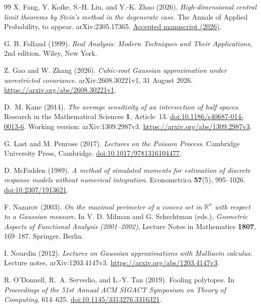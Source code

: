 \documentclass[11pt,letterpaper]{article}
\theoremstyle{remark}
\newcommand{\R}{\mathbb R}
\begin{document}
\begin{thebibliography}{99}
X. Fang, Y. Koike, S.-H. Liu, and Y.-K. Zhao (2026).
\emph{High-dimensional central limit theorems by Stein's method in
the degenerate case}. The Annals of Applied Probability, to appear.
arXiv:2305.17365.
\href{https://research.cuhk.edu.hk/en/publications/high-dimensional-central-limit-theorems-by-steins-method-in-the-d/}{Accepted manuscript (2026)}.

G. B. Folland (1999).
\emph{Real Analysis: Modern Techniques and Their Applications}, 2nd edition.
Wiley, New York.

Z. Gao and W. Zhang (2026).
\emph{Cubic-root Gaussian approximation under unrestricted covariance}.
arXiv:2608.30221v1, 31 August 2026.
\url{https://arxiv.org/abs/2608.30221v1}.

D.~M. Kane (2014).
\emph{The average sensitivity of an intersection of half spaces}.
Research in the Mathematical Sciences \textbf{1}, Article~13.
\href{https://doi.org/10.1186/s40687-014-0013-6}{doi:10.1186/s40687-014-0013-6}.
Working version: arXiv:1309.2987v3.
\url{https://arxiv.org/abs/1309.2987v3}.

G. Last and M. Penrose (2017).
\emph{Lectures on the Poisson Process}.
Cambridge University Press, Cambridge.
\href{https://doi.org/10.1017/9781316104477}{doi:10.1017/9781316104477}.

D. McFadden (1989).
\emph{A method of simulated moments for estimation of discrete
response models without numerical integration}.
Econometrica \textbf{57}(5), 995--1026.
\href{https://doi.org/10.2307/1913621}{doi:10.2307/1913621}.

F. Nazarov (2003).
\emph{On the maximal perimeter of a convex set in \(\R^n\)
with respect to a Gaussian measure}.
In V. D. Milman and G. Schechtman (eds.),
\emph{Geometric Aspects of Functional Analysis (2001--2002)},
Lecture Notes in Mathematics \textbf{1807}, 169--187.
Springer, Berlin.

I. Nourdin (2012).
\emph{Lectures on Gaussian approximations with Malliavin calculus}.
Lecture notes, arXiv:1203.4147v3.
\url{https://arxiv.org/abs/1203.4147v3}.

R. O'Donnell, R.~A. Servedio, and L.-Y. Tan (2019).
Fooling polytopes.
In \emph{Proceedings of the 51st Annual ACM SIGACT Symposium on
Theory of Computing}, 614--625.
\href{https://doi.org/10.1145/3313276.3316321}{doi:10.1145/3313276.3316321}.


\end{thebibliography}
\end{document}
